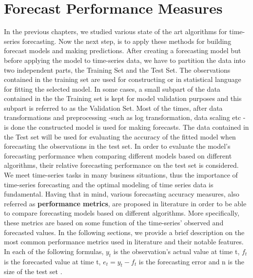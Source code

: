 \section{Forecast Performance Measures}
In the previous chapters, we studied various state of the art algorithms for time-series forecasting. Now the next step, is to apply these methods for building forecast models and making predictions. After creating a forecasting model but before applying the model to time-series data, we have to partition the data into two independent parts, the Training Set and the Test Set. The observations contained in the training set are used for constructing or in statistical language for fitting the selected model. In some cases, a small subpart of the data contained in the the Training set is kept for model validation purposes and this subpart is referred to as the Validation Set. Most of the times, after data transformations and preprocessing -such as log transformation, data scaling etc - is done the constructed model is used for making forecasts. The data contained in the Test set will be used for evaluating the accuracy of the fitted model when forecasting the observations in the test set. In order to evaluate the model's forecasting performance when comparing different models based on different algorithms, their relative forecasting performance on the test set is considered. We meet time-series tasks in many business situations, thus the importance of time-series forecasting and the optimal modeling of time series data is fundamental.
 Having that in mind, various forecasting accuracy measures, also referred as \textbf{performance metrics}, are proposed in literature in order to be able to compare forecasting models based on different algorithms. More specifically, these metrics are based on some function of the time-series' observed and forecasted values. In the following sections, we provide a brief description on the most common performance metrics used in literature and their notable features.  In each of the following formulas, $y_{t}$ is the observation's actual value at time t, $f_{t}$ is the forecasted value at time t, $e_{t}=y_{t}-f_{t}$ is the forecasting error and n is the size of the test set \cite{armstrong1992error}.
